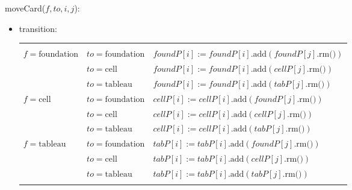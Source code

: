 \documentclass[12pt]{article}
\begin{document}
\noindent moveCard($f, to, i, j$):
\begin{itemize}
\item transition: 
\begin{tabular}{|p{3.0cm}|p{3.0cm}|l|}
\hhline{~|~|~|}
\multicolumn{1}{r}{} & \multicolumn{1}{r}{} & \multicolumn{1}{r}{}\\
\hhline{|-|-|-|}
$f = \mbox{foundation}$ & $to = \mbox{foundation}$ & $foundP[i] := foundP[i].\mbox{add}(foundP[j].\mbox{rm()})$\\
\hhline{|~|-|-|}
~ & $to = \mbox{cell}$ & $foundP[i] := foundP[i].\mbox{add}(cellP[j].\mbox{rm()})$\\
\hhline{|~|-|-|}
~ & $to = \mbox{tableau}$ & $foundP[i] := foundP[i].\mbox{add}(tabP[j].\mbox{rm()})$\\
\hhline{|-|-|-|}
$f = \mbox{cell}$ & $to = \mbox{foundation}$ & $cellP[i] := cellP[i].\mbox{add}(foundP[j].\mbox{rm()})$\\
\hhline{|~|-|-|}
~ & $to = \mbox{cell}$ & $cellP[i] := cellP[i].\mbox{add}(cellP[j].\mbox{rm()})$\\
\hhline{|~|-|-|}
~ & $to = \mbox{tableau}$ & $cellP[i] := cellP[i].\mbox{add}(tabP[j].\mbox{rm()})$\\
\hhline{|-|-|-|}
$f = \mbox{tableau}$ & $to = \mbox{foundation}$ & $tabP[i] := tabP[i].\mbox{add}(foundP[j].\mbox{rm()})$\\
\hhline{|~|-|-|}
~ & $to = \mbox{cell}$ & $tabP[i] := tabP[i].\mbox{add}(cellP[j].\mbox{rm()})$\\
\hhline{|~|-|-|}
~ & $to = \mbox{tableau}$ & $tabP[i] := tabP[i].\mbox{add}(tabP[j].\mbox{rm()})$\\
\hhline{|-|-|-|}
\end{tabular}


\end{itemize}
\end{document}

